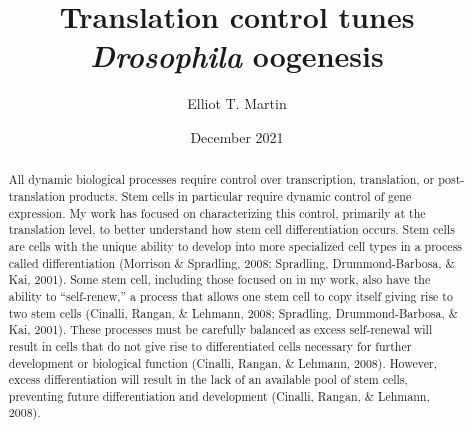 \documentclass[12pt,oneside]{reedthesis}
\title{Translation control tunes \emph{Drosophila} oogenesis}
\author{Elliot T. Martin}
\date{December 2021}
\begin{document}
  \maketitle

\frontmatter %
\pagestyle{plain} %
  \begin{abstract}
  \setcounter{page}{2}
  \pagestyle{plain}

    All dynamic biological processes require control over transcription, translation, or post-translation products. Stem cells in particular require dynamic control of gene expression. My work has focused on characterizing this control, primarily at the translation level, to better understand how stem cell differentiation occurs. Stem cells are cells with the unique ability to develop into more specialized cell types in a process called differentiation (Morrison \& Spradling, 2008; Spradling, Drummond-Barbosa, \& Kai, 2001). Some stem cell, including those focused on in my work, also have the ability to ``self-renew,'' a process that allows one stem cell to copy itself giving rise to two stem cells (Cinalli, Rangan, \& Lehmann, 2008; Spradling, Drummond-Barbosa, \& Kai, 2001). These processes must be carefully balanced as excess self-renewal will result in cells that do not give rise to differentiated cells necessary for further development or biological function (Cinalli, Rangan, \& Lehmann, 2008). However, excess differentiation will result in the lack of an available pool of stem cells, preventing future differentiation and development (Cinalli, Rangan, \& Lehmann, 2008).

\end{abstract}
\end{document}

